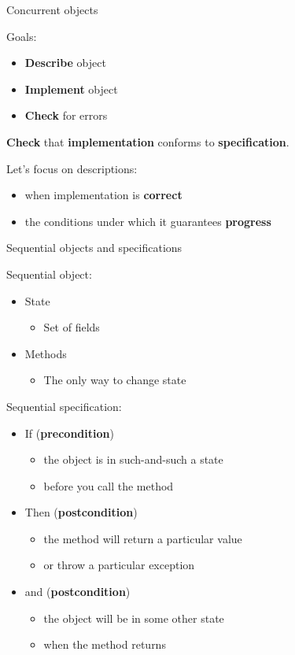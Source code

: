 \begin{frame}{Concurrent objects}

Goals:
\begin{itemize}
  \item \textbf{Describe} object
  \item \textbf{Implement} object
  \item \textbf{Check} for errors
\end{itemize}

\pause
\textbf{Check} that \textbf{implementation} conforms to \textbf{specification}.

\pause
Let's focus on descriptions: \pause
\begin{itemize}
  \item when implementation is \textbf{correct}
  \item the conditions under which it guarantees \textbf{progress}
\end{itemize}

\end{frame}


\begin{frame}{Sequential objects and specifications}

Sequential object:
\begin{itemize}
  \item State
  \begin{itemize}
    \item Set of fields
  \end{itemize}
  \item Methods
  \begin{itemize}
    \item The only way to change state
  \end{itemize}
\end{itemize}

\pause 

Sequential specification:
\begin{itemize}
  \item If (\textbf{precondition}) 
  \begin{itemize}
    \item the object is in such-and-such a state
    \item before you call the method
  \end{itemize}

  \item Then (\textbf{postcondition})
  \begin{itemize}
    \item the method will return a particular value
    \item or throw a particular exception
  \end{itemize}

  \item and (\textbf{postcondition})
  \begin{itemize}
    \item the object will be in some other state
    \item when the method returns
  \end{itemize}
\end{itemize}
\end{frame}

